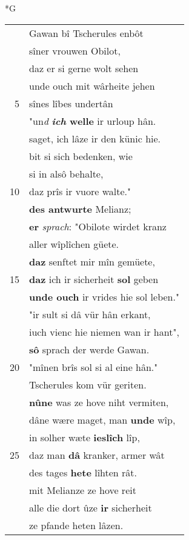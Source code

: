 \documentclass[8pt,a4paper,notitlepage]{article}
\begin{document}
\newpage
\begin{table}[ht]
\begin{minipage}[t]{0.5\linewidth}
\small
\begin{center}*G
\end{center}
\begin{tabular}{rl}
 & Gawan bî Tscherules enbôt\\ 
 & sîner vrouwen Obilot,\\ 
 & daz er si gerne wolt sehen\\ 
 & unde ouch mit wârheite jehen\\ 
5 & sînes lîbes undertân\\ 
 & "un\textit{d} \textbf{\textit{ich} welle} ir urloup hân.\\ 
 & saget, ich lâze ir den künic hie.\\ 
 & bit si sich bedenken, wie\\ 
 & si in alsô behalte,\\ 
10 & daz prîs ir vuore walte."\\ 
 & \textbf{des antwurte} Melianz;\\ 
 & \textbf{er} \textit{sprach}: "Obilote wirdet kranz\\ 
 & aller wîplîchen güete.\\ 
 & \textbf{daz} senftet mir mîn gemüete,\\ 
15 & \textbf{daz} ich ir sicherheit \textbf{sol} geben\\ 
 & \textbf{unde ouch} ir vrides hie sol leben."\\ 
 & "ir sult si dâ vür hân erkant,\\ 
 & iuch vienc hie niemen wan ir hant",\\ 
 & \textbf{sô} sprach der werde Gawan.\\ 
20 & "mînen brîs sol si al eine hân."\\ 
 & Tscherules kom vür geriten.\\ 
 & \textbf{nû}\textbf{ne} was ze hove niht vermiten,\\ 
 & dâne wære maget, man \textbf{unde} wîp,\\ 
 & in solher wæte \textbf{ieslîch} lîp,\\ 
25 & daz man \textbf{dâ} kranker, armer wât\\ 
 & des tages \textbf{hete} lîhten rât.\\ 
 & mit Melianze ze hove reit\\ 
 & alle die dort ûze \textbf{ir} sicherheit\\ 
 & ze pfande heten lâzen.\\ 

\end{tabular}
\end{minipage}
\end{table}
\end{document}
